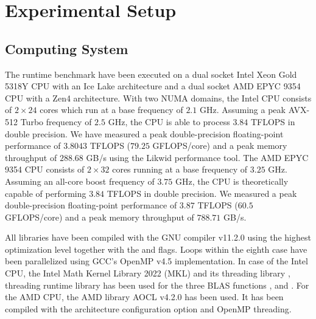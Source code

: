 \section{Experimental Setup}
\label{sec:experimental.setup}

\begin{table*}[t]

\caption%
{%
\footnotesize
Tensor shape sets and example dimension tuples that are used in our runtime benchmarking.
The first $4$ shape sets $N_1$, $N_2$, $N_3$ and $N_{10}$ are used to generate asymmetrically shaped tensors, each consisting of $72$ dimension tuples.
Shape set $M$ contains $48$ tensor shapes that are used to generate symmetrically shaped tensors.
Shape set $Q$ contains $8$ tensor shapes that are part of SDRBench \cite{zhao:2020:sdrbench}.
Note that all matrix shapes depend on the input tensor shapes and contraction mode.
}
\label{tab:dataset}
\end{table*}



\subsection{Computing System} 
The runtime benchmark have been executed on a dual socket Intel Xeon Gold 5318Y CPU with an Ice Lake architecture and a dual socket AMD EPYC 9354 CPU with a Zen4 architecture.
With two NUMA domains, the Intel CPU consists of $2\times24$ cores which run at a base frequency of $2.1$ GHz.
Assuming a peak AVX-512 Turbo frequency of $2.5$ GHz, the CPU is able to process $3.84$ TFLOPS in double precision.
We have measured a peak double-precision floating-point performance of $3.8043$ TFLOPS ($79.25$ GFLOPS/core) and a peak memory throughput of $288.68$ GB/s using the Likwid performance tool.
The AMD EPYC 9354 CPU consists of $2\times32$ cores running at a base frequency of $3.25$ GHz.
Assuming an all-core boost frequency of $3.75$ GHz, the CPU is theoretically capable of performing $3.84$ TFLOPS in double precision.
We measured a peak double-precision floating-point performance of $3.87$ TFLOPS ($60.5$ GFLOPS/core) and a peak memory throughput of $788.71$ GB/s.
 
All libraries have been compiled with the GNU compiler v11.2.0 using the highest optimization level  together with the  and  flags. 
Loops within the eighth case have been parallelized using GCC's OpenMP v4.5 implementation.
In case of the Intel CPU, the Intel Math Kernel Library 2022 (MKL) and its threading library , threading runtime library  has been used for the three BLAS functions ,  and .
For the AMD CPU, the AMD library AOCL v4.2.0 has been used.
It has been compiled with the  architecture configuration option and OpenMP threading.


